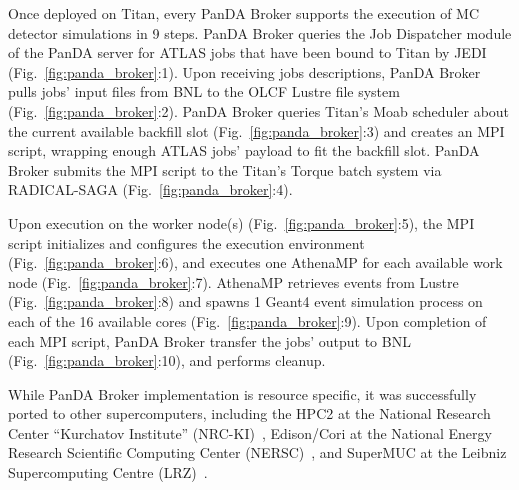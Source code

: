 Once deployed on Titan, every PanDA Broker supports the execution of MC
detector simulations in 9 steps. PanDA Broker queries the Job Dispatcher
module of the PanDA server for ATLAS jobs that have been bound to Titan by
JEDI (Fig.~\ref{fig:panda_broker}:1). Upon receiving jobs descriptions, PanDA
Broker pulls jobs' input files from BNL to the OLCF Lustre file system
(Fig.~\ref{fig:panda_broker}:2). PanDA Broker queries Titan's Moab scheduler
about the current available backfill slot (Fig.~\ref{fig:panda_broker}:3) and
creates an MPI script, wrapping enough ATLAS jobs' payload to fit the
backfill slot. PanDA Broker submits the MPI script to the Titan's Torque
batch system via RADICAL-SAGA (Fig.~\ref{fig:panda_broker}:4).

Upon execution on the worker node(s) (Fig.~\ref{fig:panda_broker}:5), the MPI
script initializes and configures the execution environment
(Fig.~\ref{fig:panda_broker}:6), and executes one AthenaMP for each available
work node (Fig.~\ref{fig:panda_broker}:7). AthenaMP retrieves events from
Lustre (Fig.~\ref{fig:panda_broker}:8) and spawns 1 Geant4 event simulation
process on each of the 16 available cores (Fig.~\ref{fig:panda_broker}:9).
Upon completion of each MPI script, PanDA Broker transfer the jobs' output to
BNL (Fig.~\ref{fig:panda_broker}:10), and performs cleanup.

While PanDA Broker implementation is resource specific, it was successfully
ported to other supercomputers, including the HPC2 at the National Research
Center ``Kurchatov Institute'' (NRC-KI)~\cite{belyaev2015integration},
Edison/Cori at the National Energy Research Scientific Computing Center
(NERSC)~\cite{barreiro2016panda}, and SuperMUC at the Leibniz Supercomputing
Centre (LRZ)~\cite{barreiro2016panda}.

